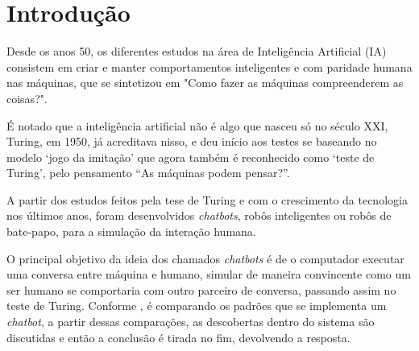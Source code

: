 \documentclass[
	12pt,				%
	oneside,
	a4paper,			%
	english,			%
	french,				%
	spanish,			%
	brazil				%
	]{abntex2}
\begin{document}

\tableofcontents*
\cleardoublepage



\textual

\chapter{Introdução}
Desde os anos 50, os diferentes estudos na área de Inteligência Artificial (IA) consistem em criar e manter comportamentos inteligentes e com paridade humana nas máquinas, que se sintetizou em "Como fazer as máquinas compreenderem as coisas?"\cite{minsky}.

É notado que a inteligência artificial não é algo que nasceu só no século XXI, Turing, em 1950, já acreditava nisso, e deu início aos testes se baseando no modelo ‘jogo da imitação’ que agora também é reconhecido como ‘teste de Turing’, pelo pensamento “As máquinas podem pensar?”.

A partir dos estudos feitos pela tese de Turing e com o crescimento da tecnologia nos últimos anos, foram desenvolvidos \emph{chatbots}, robôs inteligentes ou robôs de bate-papo, para a simulação da interação humana. 

O principal objetivo da ideia dos chamados \emph{chatbots} é de o computador executar uma conversa entre máquina e humano, simular de maneira convincente como um ser humano se comportaria com outro parceiro de conversa, passando assim no teste de Turing.  
Conforme \textcite{dahiya}, é comparando os padrões que se implementa um \emph{chatbot}, a partir dessas comparações, as descobertas dentro do sistema são discutidas e então a conclusão é tirada no fim, devolvendo a resposta.
 
\end{document}
